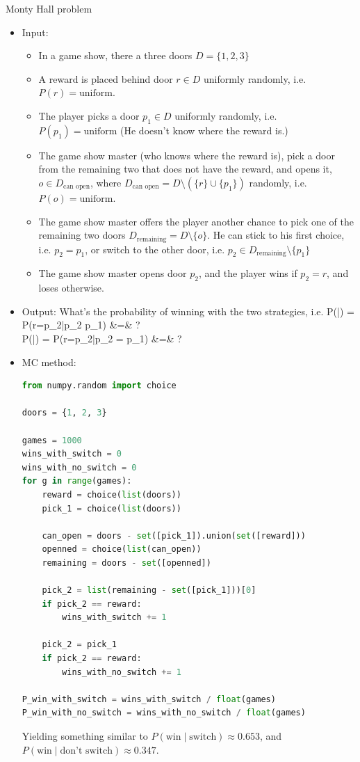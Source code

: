 \newpage
{} Monty Hall problem
\begin{itemize}
	\item Input: 
		\begin{itemize}
			\item In a game show, there a three doors $D = \{1,2,3\}$
			\item A reward is placed behind door $r\in D$ uniformly randomly, i.e. $P(r) = \text{uniform}$.
			\item The player picks a door $p_1 \in D$ uniformly randomly, i.e. $P(p_1) = \text{uniform}$ (He doesn't know where the reward is.)
			\item The game show master (who knows where the reward is), pick a door from the remaining two that does not have the reward, and opens it, $o \in D_\text{can open}$, where $D_\text{can open} = D \setminus (\{r\} \cup \{p_1\})$ randomly, i.e. $P(o) = \text{uniform}$.
			\item The game show master offers the player another chance to pick one of the remaining two doors $D_\text{remaining} = D \setminus \{o\}$. He can stick to his first choice, i.e. $p_2 = p_1$, or switch to the other door, i.e. $p_2 \in D_\text{remaining}\setminus \{p_1\}$
			\item The game show master opens door $p_2$, and the player wins if $p_2 = r$, and loses otherwise.
		\end{itemize}
	\item Output: What's the probability of winning with the two strategies, i.e.
	\ba
		P(\;|\;) = P(r=p_2\;|\;p_2 \neq p_1) &=& ?  \\
		P(\;|\;) = P(r=p_2\;|\;p_2 = p_1) &=& ?
	\ea
	\item MC method:
\begin{lstlisting}[language=python]
from numpy.random import choice

doors = {1, 2, 3}

games = 1000
wins_with_switch = 0
wins_with_no_switch = 0
for g in range(games):
    reward = choice(list(doors))
    pick_1 = choice(list(doors))

    can_open = doors - set([pick_1]).union(set([reward]))
    openned = choice(list(can_open))
    remaining = doors - set([openned])
    
    pick_2 = list(remaining - set([pick_1]))[0]
    if pick_2 == reward:
        wins_with_switch += 1
    
    pick_2 = pick_1
    if pick_2 == reward:
        wins_with_no_switch += 1
        
P_win_with_switch = wins_with_switch / float(games)
P_win_with_no_switch = wins_with_no_switch / float(games)
\end{lstlisting}
Yielding something similar to $P(\text{win}\;|\;\text{switch}) \approx 0.653$, and $P(\text{win}\;|\;\text{don't switch}) \approx 0.347$.

\end{itemize}

